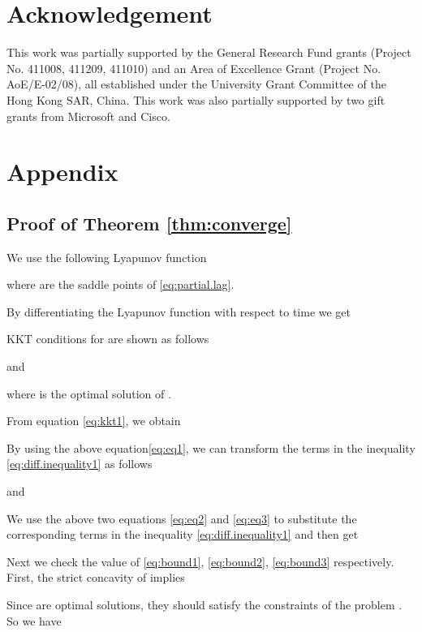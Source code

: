 \documentclass[10pt,conference]{IEEEtran}
\begin{document}
\section*{Acknowledgement}

This work was partially supported by the General Research Fund grants (Project No.
411008, 411209, 411010) and an Area of Excellence Grant (Project No.
AoE/E-02/08), all established under the University Grant Committee
of the Hong Kong SAR, China. This work was also partially supported
by two gift grants from Microsoft and Cisco.




\appendices
\section*{Appendix}

\subsection{Proof of Theorem \ref{thm:converge}} \label{sec:proof_converge}

We use the following Lyapunov function


where  are the saddle points
of \eqref{eq:partial.lag}.

By differentiating the Lyapunov function with respect to time we get




KKT conditions for  are shown as follows


and

where is the optimal solution of .

From equation \eqref{eq:kkt1}, we obtain


By using the above equation\eqref{eq:eq1}, we can transform the
terms in the inequality \eqref{eq:diff.inequality1} as follows


and



We use the above two equations \eqref{eq:eq2} and \eqref{eq:eq3} to
substitute the corresponding terms in the inequality
\eqref{eq:diff.inequality1} and then get




Next we check the value of \eqref{eq:bound1}, \eqref{eq:bound2},
\eqref{eq:bound3} respectively. First, the strict concavity of 
implies




Since  are optimal solutions, they
should satisfy the constraints of the problem . So we
have
\end{document}
